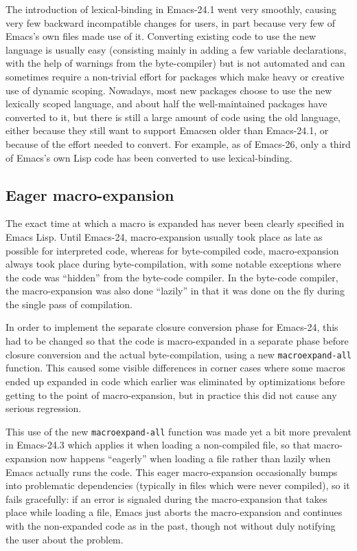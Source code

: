 \documentclass[format=acmsmall, review]{acmart}
\newcommand \Elisp {Emacs Lisp}
\begin{document}
The introduction of lexical-binding in Emacs-24.1 went very smoothly,
causing very few backward incompatible changes for users, in part because
very few of Emacs's own files made use of it.  Converting existing code to
use the new language is usually easy (consisting mainly in adding a few
variable declarations, with the help of warnings from the byte-compiler) but
is not automated and can sometimes require a non-trivial effort for packages
which make heavy or creative use of dynamic scoping.  Nowadays, most new
packages choose to use the new lexically scoped language, and about half the
well-maintained packages have converted to it, but there is still a large
amount of code using the old language, either because they still want to
support Emacsen older than Emacs-24.1, or because of the effort needed to
convert.  For example, as of Emacs-26, only a third of Emacs's own Lisp code
has been converted to use lexical-binding.


\subsection{Eager macro-expansion} %
\label{sec:eager-macro-expansion}

The exact time at which a macro is expanded has never been clearly specified
in \Elisp{}.  Until Emacs-24, macro-expansion usually took place as late as
possible for interpreted code, whereas for byte-compiled code,
macro-expansion always took place during byte-compilation, with some notable
exceptions where the code was ``hidden'' from the byte-code compiler.  In the
byte-code compiler, the macro-expansion was also done ``lazily'' in that it was
done on the fly during the single pass of compilation.

In order to implement the separate closure conversion phase for Emacs-24,
this had to be changed so that the code is macro-expanded in a separate
phase before closure conversion and the actual byte-compilation, using a new
\texttt{macroexpand-all} function.
This caused some visible differences in corner cases where some macros ended
up expanded in code which earlier was eliminated by optimizations before
getting to the point of macro-expansion, but in practice this did not cause
any serious regression.

This use of the new \texttt{macroexpand-all} function was made yet a bit
more prevalent in Emacs-24.3 which applies it when loading
a non-compiled file, so that macro-expansion now happens ``eagerly'' when
loading a file rather than lazily when Emacs actually runs the code.  This eager
macro-expansion occasionally bumps into problematic dependencies (typically
in files which were never compiled), so it fails gracefully: if an
error is signaled during the macro-expansion that takes place while loading
a file, Emacs just aborts the macro-expansion and continues with the non-expanded
code as in the past, though not without duly notifying the user about
the problem.
\end{document}
